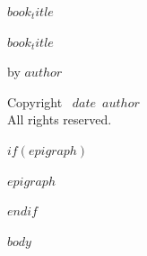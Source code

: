 \documentclass[12pt]{memoir}
\def\booktitle{$book_title$}
\def\bookauthor{$author$}
\def\bookdate{$date$}
\begin{document}
\thispagestyle{empty}
{\Huge\scshape\booktitle}

\clearpage
\thispagestyle{empty}
\begin{center}
\vspace*{1in}
{\HUGE\bfseries\booktitle\par}
\vfill
{\Large by \bookauthor}
\end{center}

\clearpage
\thispagestyle{empty}
\vspace*{\fill}
\begin{center}
Copyright \textcopyright\ \bookdate\ \bookauthor\\
All rights reserved.
\end{center}
\vspace*{\fill}

$if(epigraph)$
\clearpage
\begin{center}
\textit{$epigraph$}
\end{center}
$endif$

\clearpage
\tableofcontents

$body$
\end{document}

